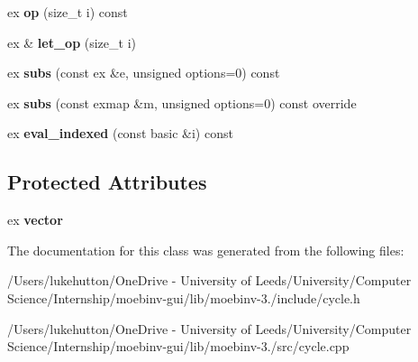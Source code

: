\begin{DoxyCompactItemize}
ex {\bfseries op} (size\+\_\+t i) const
\item 
\mbox{\label{class_moeb_inv_1_1paravector_a02cf54eb6955a808efbb1327ce272736}} 
ex \& {\bfseries let\+\_\+op} (size\+\_\+t i)
\item 
\mbox{\label{class_moeb_inv_1_1paravector_acaf6c490368d4e7ec4f0ed50e6945f13}} 
ex {\bfseries subs} (const ex \&e, unsigned options=0) const
\item 
\mbox{\label{class_moeb_inv_1_1paravector_a7536e454cf2e175d65b3c023c0360ec1}} 
ex {\bfseries subs} (const exmap \&m, unsigned options=0) const override
\item 
\mbox{\label{class_moeb_inv_1_1paravector_abe706e5135af461a41c8ed27b2ee2a49}} 
ex {\bfseries eval\+\_\+indexed} (const basic \&i) const
\end{DoxyCompactItemize}
\subsection*{Protected Attributes}
\begin{DoxyCompactItemize}
\item 
\mbox{\label{class_moeb_inv_1_1paravector_ac3ebeee2d10e76e9aeaa659a84ae6f24}} 
ex {\bfseries vector}
\end{DoxyCompactItemize}


The documentation for this class was generated from the following files\+:\begin{DoxyCompactItemize}
\item 
/\+Users/lukehutton/\+One\+Drive -\/ University of Leeds/\+University/\+Computer Science/\+Internship/moebinv-\/gui/lib/moebinv-\/3./include/cycle.\+h\item 
/\+Users/lukehutton/\+One\+Drive -\/ University of Leeds/\+University/\+Computer Science/\+Internship/moebinv-\/gui/lib/moebinv-\/3./src/cycle.\+cpp\end{DoxyCompactItemize}
